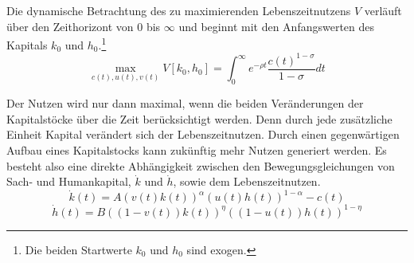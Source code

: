 %
Die dynamische Betrachtung des zu maximierenden Lebenszeitnutzens $V$ verläuft über den Zeithorizont von $0$ bis $\infty$ und beginnt mit den Anfangswerten des Kapitals $k_0$ und $h_0$.\footnote{Die beiden Startwerte $k_0$ und $h_0$ sind exogen.}
%
\begin{equation}\operatorname*{max}_{c(t),u(t),v(t)}V[k_0,h_0]= \int_{0}^\infty e^{-\rho t} \frac{c(t)^{1-\sigma}}{1-\sigma}dt\end{equation}
%

Der Nutzen wird nur dann maximal, wenn die beiden Veränderungen der Kapitalstöcke über die Zeit berücksichtigt werden. Denn durch jede zusätzliche Einheit Kapital verändert sich der Lebenszeitnutzen. Durch einen gegenwärtigen Aufbau eines Kapitalstocks kann zukünftig mehr Nutzen generiert werden. Es besteht also eine direkte Abhängigkeit zwischen den Bewegungsgleichungen von Sach- und Humankapital, $\dot{k}$ und $\dot{h}$, sowie dem Lebenszeitnutzen.
%
\begin{equation}\dot{k}(t)=A(v(t)k(t))^\alpha(u(t)h(t))^{1-\alpha}-c(t)\end{equation}
%
\vspace{-0.8cm}
	\begin{equation} \dot{h}(t)=B((1-v(t))k(t))^{\eta}((1-u(t))h(t))^{1-\eta}\end{equation}
%

